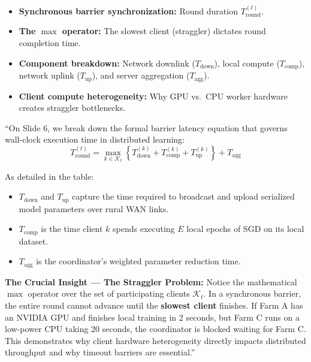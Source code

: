 \documentclass[11pt,a4paper]{article}
\begin{document}
\begin{tcolorbox}[colframe=primaryblue, title=\textbf{Key Distributed Systems Points to Emphasize}]
\begin{itemize}[leftmargin=*]
    \item \textbf{Synchronous barrier synchronization:} Round duration $T_{\text{round}}^{(t)}$.
    \item \textbf{The $\max$ operator:} The slowest client (straggler) dictates round completion time.
    \item \textbf{Component breakdown:} Network downlink ($T_{\text{down}}$), local compute ($T_{\text{comp}}$), network uplink ($T_{\text{up}}$), and server aggregation ($T_{\text{agg}}$).
    \item \textbf{Client compute heterogeneity:} Why GPU vs.\ CPU worker hardware creates straggler bottlenecks.
\end{itemize}
\end{tcolorbox}

\begin{tcolorbox}[colframe=darkgreen, title=\textbf{What to Say in the Presentation (Literal Script)}]
``On Slide 6, we break down the formal barrier latency equation that governs wall-clock execution time in distributed learning:
\[ T_{\text{round}}^{(t)} = \max_{k \in \mathcal{K}_t} \left\{ T_{\text{down}}^{(k)} + T_{\text{comp}}^{(k)} + T_{\text{up}}^{(k)} \right\} + T_{\text{agg}} \]

As detailed in the table:
\begin{itemize}
    \item $T_{\text{down}}$ and $T_{\text{up}}$ capture the time required to broadcast and upload serialized model parameters over rural WAN links.
    \item $T_{\text{comp}}$ is the time client $k$ spends executing $E$ local epochs of SGD on its local dataset.
    \item $T_{\text{agg}}$ is the coordinator's weighted parameter reduction time.
\end{itemize}

\textbf{The Crucial Insight --- The Straggler Problem:} Notice the mathematical $\max$ operator over the set of participating clients $\mathcal{K}_t$. In a synchronous barrier, the entire round cannot advance until the \textbf{slowest client} finishes. If Farm A has an NVIDIA GPU and finishes local training in 2 seconds, but Farm C runs on a low-power CPU taking 20 seconds, the coordinator is blocked waiting for Farm C. This demonstrates why client hardware heterogeneity directly impacts distributed throughput and why timeout barriers are essential.''
\end{tcolorbox}
\end{document}
